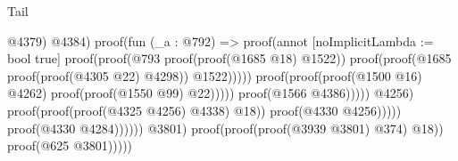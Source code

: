 \begin{lexlean}{Tail}
\begin{coremodule}
                                                                                        @4379)
                                                                                      @4384)
                                                                                    proof(fun (_a : @792) =>
                                                                                      proof(annot [noImplicitLambda := bool true]
                                                                                        proof(proof(@793
                                                                                              proof(proof(@1685
                                                                                                    @18)
                                                                                                  @1522))
                                                                                            proof(proof(@1685
                                                                                                  proof(proof(@4305
                                                                                                        @22)
                                                                                                      @4298))
                                                                                                @1522)))))
                                                                                  proof(proof(proof(@1500
                                                                                          @16)
                                                                                        @4262)
                                                                                      proof(proof(@1550
                                                                                            @99)
                                                                                          @22)))))
                                                                        proof(@1566 @4386)))))
                                                            @4256)
                                                          proof(proof(proof(@4325 @4256) @4338)
                                                              @18))
                                                        proof(@4330 @4256)))))
                                              proof(@4330 @4284))))))
                                @3801)
                              proof(proof(proof(@3939 @3801) @374) @18))
                            proof(@625 @3801)))))

\end{coremodule}
\end{lexlean}

